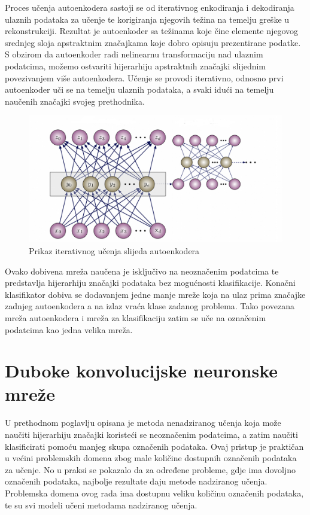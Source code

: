 \documentclass[lmodern, utf8, diplomski, numeric]{fer}
\begin{document}
Proces učenja autoenkodera sastoji se od iterativnog enkodiranja i dekodiranja ulaznih podataka za učenje te korigiranja njegovih težina na temelju greške u rekonstrukciji. Rezultat je autoenkoder sa težinama koje čine elemente njegovog srednjeg sloja apstraktnim značajkama koje dobro opisuju prezentirane podatke. S obzirom da autoenkoder radi nelinearnu transformaciju nad ulaznim podatcima, možemo ostvariti hijerarhiju apstraktnih značajki slijednim povezivanjem više autoenkodera. Učenje se provodi iterativno, odnosno prvi autoenkoder uči se na temelju ulaznih podataka, a svaki idući na temelju naučenih značajki svojeg prethodnika. 

\begin{figure}[ht!]	
\centering
\includegraphics[width=16cm]{slike/stacked_autoencoders.jpg}
\caption{Prikaz iterativnog učenja slijeda autoenkodera}
\end{figure}

Ovako dobivena mreža naučena je isključivo na neoznačenim podatcima te predstavlja hijerarhiju značajki podataka bez mogućnosti klasifikacije. Konačni klasifikator dobiva se dodavanjem jedne manje mreže koja na ulaz prima značajke zadnjeg autoenkodera a na izlaz vraća klase zadanog problema. Tako povezana mreža autoenkodera i mreža za klasifikaciju zatim se uče na označenim podatcima kao jedna velika mreža.


\chapter{Duboke konvolucijske neuronske mreže}

U prethodnom poglavlju opisana je metoda nenadziranog učenja koja može naučiti hijerarhiju značajki koristeći se neoznačenim podatcima, a zatim naučiti klasificirati pomoću manjeg skupa označenih podataka. Ovaj pristup je praktičan u većini problemskih domena zbog male količine dostupnih označenih podataka za učenje. No u praksi se pokazalo da za određene probleme, gdje ima dovoljno označenih podataka, najbolje rezultate daju metode nadziranog učenja. Problemska domena ovog rada ima dostupnu veliku količinu označenih podataka, te su svi modeli učeni metodama nadziranog učenja.
\end{document}
